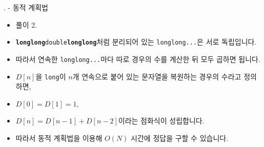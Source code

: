 \begin{frame}{\probno{}. \probtitle{} - 동적 계획법}
    \begin{itemize}
        \item 풀이 2.
        \item \texttt{\textbf{longlong}double\textbf{longlong}}처럼 분리되어 있는 \texttt{longlong...}은 서로 독립입니다.
        \item 따라서 연속한 \texttt{longlong...}마다 따로 경우의 수를 계산한 뒤 모두 곱하면 됩니다.
        \item $D[n]$을 \texttt{long}이 $n$개 연속으로 붙어 있는 문자열을 복원하는 경우의 수라고 정의하면,
        \item $D[0] = D[1] = 1$,
        \item $D[n] = D[n-1] + D[n-2]$이라는 점화식이 성립합니다.
        \item 따라서 동적 계획법을 이용해 $O(N)$ 시간에 정답을 구할 수 있습니다.
    \end{itemize}
\end{frame}
